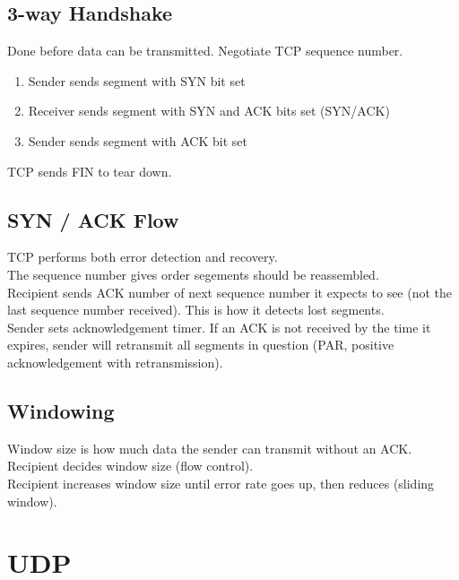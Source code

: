 \documentclass{article}
\begin{document}
\subsection{3-way Handshake}

Done before data can be transmitted. Negotiate TCP sequence number.

\begin{enumerate}

\item Sender sends segment with SYN bit set
\item Receiver sends segment with SYN and ACK bits set (SYN/ACK)
\item Sender sends segment with ACK bit set

\end{enumerate}

TCP sends FIN to tear down.

\subsection{SYN / ACK Flow}

TCP performs both error detection and recovery.\\

The sequence number gives order segements should be reassembled.\\

Recipient sends ACK number of next sequence number it expects to see (not the
last sequence number received). This is how it detects lost segments.\\

Sender sets acknowledgement timer. If an ACK is not received by the time
it expires, sender will retransmit all segments in question (PAR,
positive acknowledgement with retransmission).

\subsection{Windowing}

Window size is how much data the sender can transmit without an ACK.\\

Recipient decides window size (flow control).\\

Recipient increases window size until error rate goes up, then reduces (sliding
window).

\section{UDP}
\end{document}
